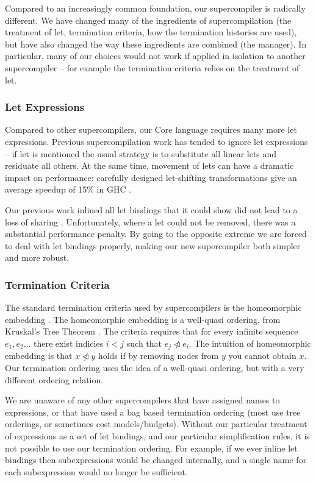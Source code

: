 \documentclass[draft]{sigplanconf}
\begin{document}
Compared to an increasingly common foundation, our supercompiler is radically different. We have changed many of the ingredients of supercompilation (the treatment of let, termination criteria, how the termination histories are used), but have also changed the way these ingredients are combined (the manager). In particular, many of our choices would not work if applied in isolation to another supercompiler -- for example the termination criteria relies on the treatment of let.

\subsubsection{Let Expressions}

Compared to other supercompilers, our Core language requires many more let expressions. Previous supercompilation work has tended to ignore let expressions -- if let is mentioned the usual strategy is to substitute all linear lets and residuate all others. At the same time, movement of lets can have a dramatic impact on performance: carefully designed let-shifting transformations give an average speedup of 15\% in GHC \cite{spj:letfloating}.

Our previous work inlined all let bindings that it could show did not lead to a loss of sharing \cite{me:supero}. Unfortunately, where a let could not be removed, there was a substantial performance penalty. By going to the opposite extreme we are forced to deal with let bindings properly, making our new supercompiler both simpler and more robust.

\subsubsection{Termination Criteria}

The standard termination criteria used by supercompilers is the homeomorphic embedding \cite{leuschel:homeomorphic}. The homeomorphic embedding is a well-quasi ordering, from Kruskal's Tree Theorem \cite{kruskal:tree}. The criteria requires that for every infinite sequence $e_1,e_2 \ldots$ there exist indicies $i < j$ such that $e_j \ntriangleleft e_i$. The intuition of homeomorphic embedding is that $x \ntriangleleft y$ holds if by removing nodes from $y$ you cannot obtain $x$. Our termination ordering uses the idea of a well-quasi ordering, but with a very different ordering relation.

We are unaware of any other supercompilers that have assigned names to expressions, or that have used a bag based termination ordering (most use tree orderings, or sometimes cost models/budgets). Without our particular treatment of expressions as a set of let bindings, and our particular simplification rules, it is not possible to use our termination ordering. For example, if we ever inline let bindings then subexpressions would be changed internally, and a single name for each subexpression would no longer be sufficient.
\end{document}
